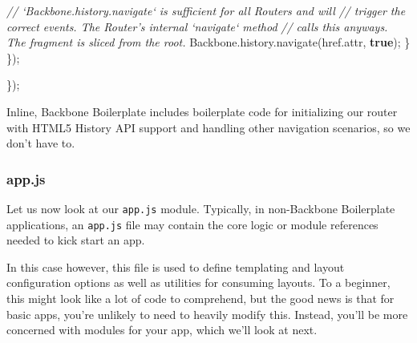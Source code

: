 \documentclass[9pt]{book}
\newenvironment{Shaded}{}{}
\newcommand{\KeywordTok}[1]{\textcolor[rgb]{0.00,0.44,0.13}{\textbf{{#1}}}}
\newcommand{\CommentTok}[1]{\textcolor[rgb]{0.38,0.63,0.69}{\textit{{#1}}}}
\newcommand{\OtherTok}[1]{\textcolor[rgb]{0.00,0.44,0.13}{{#1}}}
\newcommand{\FunctionTok}[1]{\textcolor[rgb]{0.02,0.16,0.49}{{#1}}}
\newcommand{\NormalTok}[1]{{#1}}
\begin{document}
\begin{Shaded}
\begin{Highlighting}[]
      \CommentTok{// `Backbone.history.navigate` is sufficient for all Routers and will}
      \CommentTok{// trigger the correct events. The Router's internal `navigate` method}
      \CommentTok{// calls this anyways.  The fragment is sliced from the root.}
      \OtherTok{Backbone}\NormalTok{.}\OtherTok{history}\NormalTok{.}\FunctionTok{navigate}\NormalTok{(}\OtherTok{href}\NormalTok{.}\FunctionTok{attr}\NormalTok{, }\KeywordTok{true}\NormalTok{);}
    \NormalTok{\}}
  \NormalTok{\});}

\NormalTok{\});}
\end{Highlighting}
\end{Shaded}

Inline, Backbone Boilerplate includes boilerplate code for initializing
our router with HTML5 History API support and handling other navigation
scenarios, so we don't have to.

\subsubsection{app.js}\label{app.js}

Let us now look at our \texttt{app.js} module. Typically, in
non-Backbone Boilerplate applications, an \texttt{app.js} file may
contain the core logic or module references needed to kick start an app.

In this case however, this file is used to define templating and layout
configuration options as well as utilities for consuming layouts. To a
beginner, this might look like a lot of code to comprehend, but the good
news is that for basic apps, you're unlikely to need to heavily modify
this. Instead, you'll be more concerned with modules for your app, which
we'll look at next.
\end{document}
